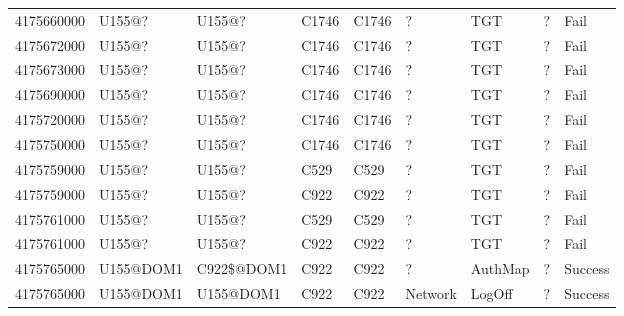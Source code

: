 \begin{table}[htbp]
{\begin{tabular}{lllllllll}
			4175660000 & U155@? & U155@? & C1746 & C1746 & ? & TGT & ? & Fail \\
			4175672000 & U155@? & U155@? & C1746 & C1746 & ? & TGT & ? & Fail \\
			4175673000 & U155@? & U155@? & C1746 & C1746 & ? & TGT & ? & Fail \\
			4175690000 & U155@? & U155@? & C1746 & C1746 & ? & TGT & ? & Fail \\
			4175720000 & U155@? & U155@? & C1746 & C1746 & ? & TGT & ? & Fail \\
			4175750000 & U155@? & U155@? & C1746 & C1746 & ? & TGT & ? & Fail \\
			4175759000 & U155@? & U155@? & C529 & C529 & ? & TGT & ? & Fail \\
			4175759000 & U155@? & U155@? & C922 & C922 & ? & TGT & ? & Fail \\
			4175761000 & U155@? & U155@? & C529 & C529 & ? & TGT & ? & Fail \\
			4175761000 & U155@? & U155@? & C922 & C922 & ? & TGT & ? & Fail \\
			4175765000 & U155@DOM1 & C922\$@DOM1 & C922 & C922 & ? & AuthMap & ? & Success \\
			4175765000 & U155@DOM1 & U155@DOM1 & C922 & C922 & Network & LogOff & ? & Success
		\end{tabular}
	}
\end{table}
